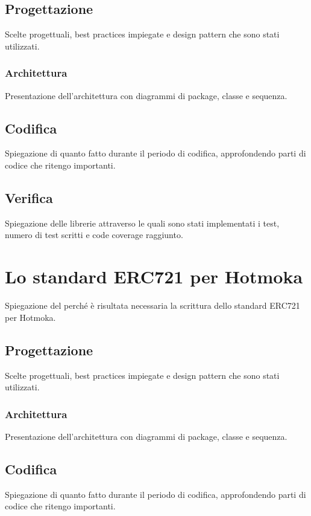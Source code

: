 \subsection{Progettazione}
Scelte progettuali, best practices impiegate e design pattern che sono stati utilizzati. 

\subsubsection{Architettura}
Presentazione dell'architettura con diagrammi di package, classe e sequenza.

\subsection{Codifica}
Spiegazione di quanto fatto durante il periodo di codifica, approfondendo parti di codice che ritengo importanti.

\subsection{Verifica}
Spiegazione delle librerie attraverso le quali sono stati implementati i test, numero di test scritti e code coverage raggiunto.


\section{Lo standard ERC721 per Hotmoka}
Spiegazione del perché è risultata necessaria la scrittura dello standard ERC721 per Hotmoka.

\subsection{Progettazione}
Scelte progettuali, best practices impiegate e design pattern che sono stati utilizzati. 

\subsubsection{Architettura}
Presentazione dell'architettura con diagrammi di package, classe e sequenza.

\subsection{Codifica}
Spiegazione di quanto fatto durante il periodo di codifica, approfondendo parti di codice che ritengo importanti.

